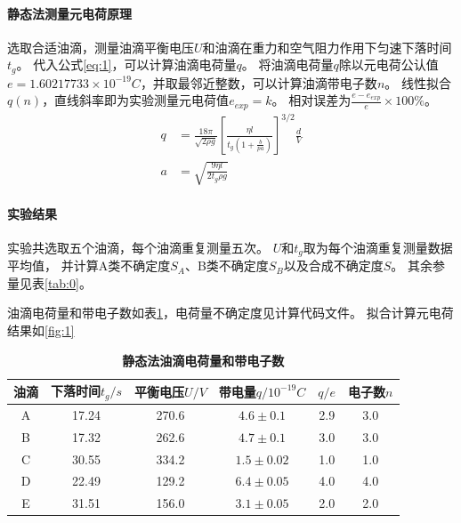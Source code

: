 \documentclass[12pt,a4paper,UTF8]{ctexart}
\begin{document}
    \paragraph{静态法测量元电荷原理}
    \newline
	\indent
    选取合适油滴，测量油滴平衡电压$U$和油滴在重力和空气阻力作用下匀速下落时间$t_g$。
    代入公式\ref{eq:1}，可以计算油滴电荷量$q$。
    将油滴电荷量$q$除以元电荷公认值$e = 1.60217733 \times 10^{-19} C$，并取最邻近整数，可以计算油滴带电子数$n$。
    线性拟合$q(n)$，直线斜率即为实验测量元电荷值$e_{exp} = k$。
    相对误差为$\frac{e-e_{exp}}{e} \times 100\%$。
    \begin{align}
        q &= \frac{18\pi}{\sqrt{2\rho g}}\left[\frac{\eta l}{t_g \left(1+\frac{b}{pa}\right) }\right]^{3/2} \frac{d}{V} \\
        a &= \sqrt{\frac{9\eta l}{2t_g\rho g}}
        \label{eq:1}
    \end{align}

    \paragraph{实验结果}
    \newline
	\indent
    实验共选取五个油滴，每个油滴重复测量五次。
    $U$和$t_g$取为每个油滴重复测量数据平均值，
    并计算A类不确定度$S_A$、B类不确定度$S_B$以及合成不确定度$S$。
    其余参量见表\ref{tab:0}。
    
    油滴电荷量和带电子数如表\ref{tab:1.1}，电荷量不确定度见计算代码文件。
    拟合计算元电荷结果如\ref{fig:1}
    \begin{table}[htbp]
        \centering
            \begin{tabular}{cccccc}
                \toprule
                油滴    &下落时间$t_g /s$	&平衡电压$U/V$    &带电量$q/10^{-19}C$ &$q/e$  &电子数$n$  \\
                \midrule
                A   &17.24  &270.6	&$4.6 \pm 0.1$   &2.9   &3.0   \\
                B   &17.32	&262.6	&$4.7 \pm 0.1$   &3.0   &3.0   \\
                C   &30.55	&334.2	&$1.5 \pm 0.02$  &1.0   &1.0   \\
                D   &22.49	&129.2	&$6.4 \pm 0.05$  &4.0   &4.0   \\
                E   &31.51	&156.0	&$3.1 \pm 0.05$  &2.0   &2.0   \\
                \bottomrule
            \end{tabular}
            \caption{\textbf{静态法油滴电荷量和带电子数}}
            \label{tab:1.1}
    \end{table}
\end{document}
